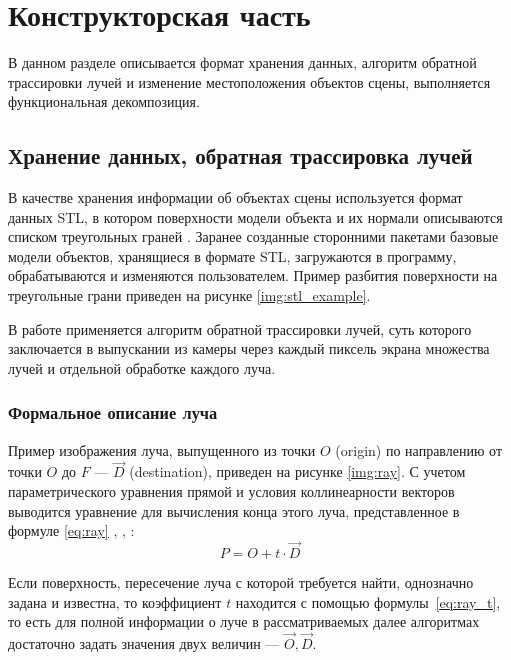 \chapter{Конструкторская часть}

В данном разделе описывается формат хранения данных, алгоритм обратной трассировки лучей и изменение местоположения объектов сцены, выполняется функциональная декомпозиция.

\section{Хранение данных, обратная трассировка лучей}

В качестве хранения информации об объектах сцены используется формат данных STL, в котором поверхности модели объекта и их нормали описываются списком треугольных граней \cite{szilvsi2003analysis}.
Заранее созданные сторонними пакетами базовые модели объектов, хранящиеся в формате STL, загружаются в программу, обрабатываются и изменяются пользователем.
Пример разбития поверхности на треугольные грани приведен на рисунке \ref{img:stl_example}.


В работе применяется алгоритм обратной трассировки лучей, суть которого заключается в выпускании из камеры через каждый пиксель экрана множества лучей и отдельной обработке каждого луча.

\subsection{Формальное описание луча}

Пример изображения луча, выпущенного из точки $O$ (origin) по направлению от точки $O$ до $F$ --- $\overrightarrow{D}$ (destination), приведен на рисунке \ref{img:ray}.
С учетом параметрического уравнения прямой и условия коллинеарности векторов выводится уравнение для вычисления конца этого луча, представленное в формуле \ref{eq:ray} \cite{божко2007компьютерная}, \cite{роджерс}, \cite{боресков}:
\begin{equation}\label{eq:ray}
	P = O + t \cdot \overrightarrow{D}
\end{equation}


Если поверхность, пересечение луча с которой требуется найти, однозначно задана и известна, то коэффициент $t$ находится с помощью формулы~\ref{eq:ray_t}, то есть для полной информации о луче в рассматриваемых далее алгоритмах достаточно задать значения двух величин --- $\overrightarrow{O}, \overrightarrow{D}$.

